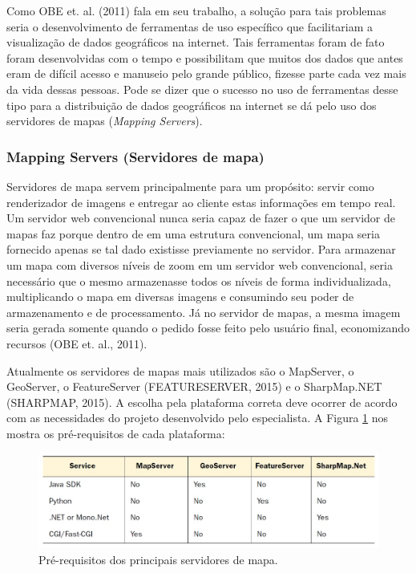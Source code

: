 		Como OBE et. al. (2011)\cite{OBE_etal11} fala em seu trabalho, a solução para tais problemas seria o desenvolvimento de ferramentas de uso específico que facilitariam a visualização de dados geográficos na internet. Tais ferramentas foram de fato foram desenvolvidas com o tempo e possibilitam que muitos dos dados que antes eram de difícil acesso e manuseio pelo grande público, fizesse parte cada vez mais da vida dessas pessoas. Pode se dizer que o sucesso no uso de ferramentas desse tipo para a distribuição de dados geográficos na internet se dá pelo uso dos servidores de mapas (\textit{Mapping Servers}).
		
		\subsubsection{Mapping Servers (Servidores de mapa)}
		
		Servidores de mapa servem principalmente para um propósito: servir como renderizador de imagens e entregar ao cliente estas informações em tempo real. Um servidor web convencional nunca seria capaz de fazer o que um servidor de mapas faz porque dentro de em uma estrutura convencional, um mapa seria fornecido apenas se tal dado existisse previamente no servidor. Para armazenar um mapa com diversos níveis de zoom em um servidor web convencional, seria necessário que o mesmo armazenasse todos os níveis de forma individualizada, multiplicando o mapa em diversas imagens e consumindo seu poder de armazenamento e de processamento. Já no servidor de mapas, a mesma imagem seria gerada somente quando o pedido fosse feito pelo usuário final, economizando recursos (OBE et. al., 2011)\cite{OBE_etal11}.
		
		Atualmente os servidores de mapas mais utilizados são o MapServer, o GeoServer, o FeatureServer (FEATURESERVER, 2015)\cite{FEATURESERVER} e o SharpMap.NET (SHARPMAP, 2015)\cite{SHARPMAP}. A escolha pela plataforma correta deve ocorrer de acordo com as necessidades do projeto desenvolvido pelo especialista. A Figura \ref{fig:prerequisitosmappingservers} nos mostra os pré-requisitos de cada plataforma:
		
		\begin{figure}
			\centering
			\includegraphics[width=1\linewidth]{data/prerequisitos_mapping_servers}
			\caption{Pré-requisitos dos principais servidores de mapa. \cite{OBE_etal11}}
			\label{fig:prerequisitosmappingservers}
		\end{figure}
		
